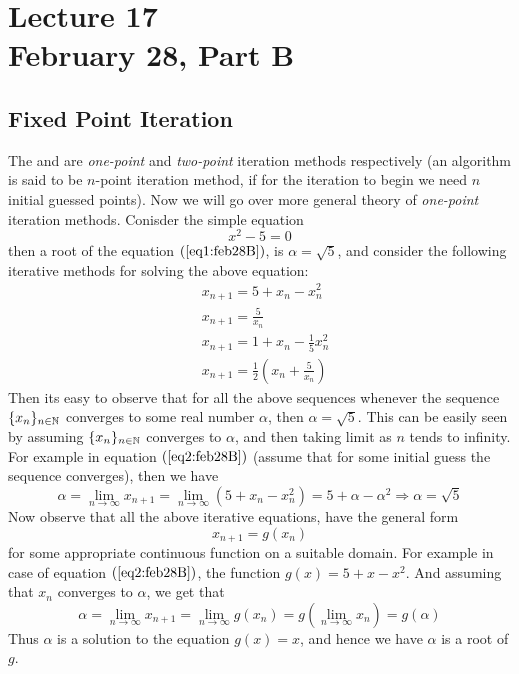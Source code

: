\chapter*{Lecture 17 \\ February 28, Part B}
\setcounter{chapter}{17}
\setcounter{section}{0}
\setcounter{equation}{0}
\section{Fixed Point Iteration}

The  and  are \textit{one-point} and \textit{two-point} iteration methods respectively (an algorithm is said to be $n$-point iteration method, if for the iteration to begin we need $n$ initial guessed points). Now we will go over more general theory of \textit{one-point} iteration methods. Conisder the simple equation 
\begin{equation}\label{eq1:feb28B}
    x^2 - 5 = 0
\end{equation}
then a root of the equation $(\ref{eq1:feb28B})$, is $\alpha = \sqrt{5}$, and consider the following iterative methods for solving the above equation: 
\begin{align}\label{eq2:feb28B}
    &x_{n+1} = 5 + x_n - x_n^2 \\ 
    &x_{n+1} = \frac{5}{x_n} \\ 
    &x_{n+1} = 1 + x_n - \frac{1}{5}x_n^2 \\    
    &x_{n+1} = \frac{1}{2}\left(x_n + \frac{5}{x_n}\right)  
\end{align}
Then its easy to observe that for all the above sequences whenever the sequence $\{x_n\}_{n\in\mathbb{N}}$ converges to some real number $\alpha$, then $\alpha = \sqrt{5}$. This can be easily seen by assuming $\{x_n\}_{n \in \mathbb{N}}$ converges to $\alpha$, and then taking limit as $n$ tends to infinity. For example in equation $(\ref{eq2:feb28B})$ (assume that for some initial guess the sequence converges), then we have 
\[
   \alpha = \lim_{n\to\infty} x_{n+1} = \lim_{n\to\infty} \left( 5+x_n-x_n^2 \right) = 5 + \alpha - \alpha^2 \Rightarrow \alpha = \sqrt{5}  
\] 
Now observe that all the above iterative equations, have the general form 
\begin{equation}\label{eq3:feb28B}
    x_{n+1} = g(x_n)
\end{equation}
for some appropriate continuous function on a suitable domain. For example in case of equation $(\ref{eq2:feb28B})$, the function $g(x) = 5+x-x^2$. And assuming that $x_n$ converges to $\alpha$, we get that 
\[
    \alpha = \lim_{n\to\infty} x_{n+1} = \lim_{n\to\infty} g(x_n) = g \left( \lim_{n\to\infty} x_n \right) = g(\alpha)  
\]
Thus $\alpha$ is a solution to the equation $g(x)=x$, and hence we have $\alpha$ is a root of $g$.

